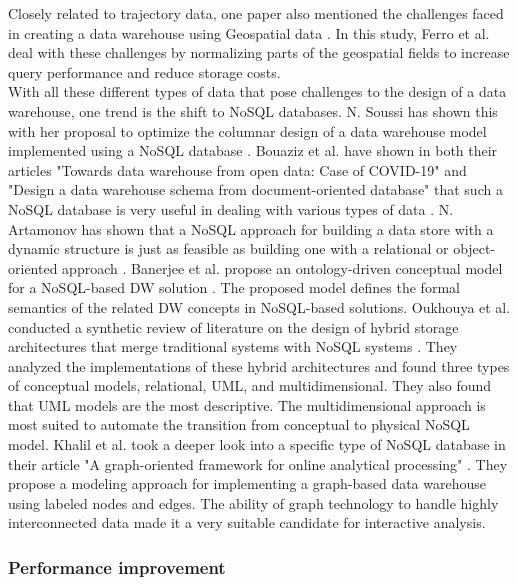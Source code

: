 \documentclass[11pt]{article}
\begin{document}
Closely related to trajectory data, one paper also mentioned the challenges faced in creating a data warehouse using Geospatial data \cite{Ferro2019221}. In this study, Ferro et al. deal with these challenges by normalizing parts of the geospatial fields to increase query performance and reduce storage costs.\\

With all these different types of data that pose challenges to the design of a data warehouse, one trend is the shift to NoSQL databases. N. Soussi has shown this with her proposal to optimize the columnar design of a data warehouse model implemented using a NoSQL database \cite{Soussi2023762}. Bouaziz et al. have shown in both their articles "Towards data warehouse from open data: Case of COVID-19" and "Design a data warehouse schema from document-oriented database" that such a NoSQL database is very useful in dealing with various types of data \cite{Bouaziz2019221, Bouaziz2021129}. N. Artamonov has shown that a NoSQL approach for building a data store with a dynamic structure is just as feasible as building one with a relational or object-oriented approach \cite{Artamonov2019794}. Banerjee et al. propose an ontology-driven conceptual model for a NoSQL-based DW solution \cite{Banerjee2021162}. The proposed model defines the formal semantics of the related DW concepts in NoSQL-based solutions. Oukhouya et al. conducted a synthetic review of literature on the design of hybrid storage architectures that merge traditional systems with NoSQL systems \cite{Oukhouya2023332}. They analyzed the implementations of these hybrid architectures and found three types of conceptual models, relational, UML, and multidimensional. They also found that UML models are the most descriptive. The multidimensional approach is most suited to automate the transition from conceptual to physical NoSQL model. Khalil et al. took a deeper look into a specific type of NoSQL database in their article "A graph-oriented framework for online analytical processing" \cite{Khalil2022547}. They propose a modeling approach for implementing a graph-based data warehouse using labeled nodes and edges. The ability of graph technology to handle highly interconnected data made it a very suitable candidate for interactive analysis. \\

\subsubsection{Performance improvement}
\label{performance}
\end{document}
